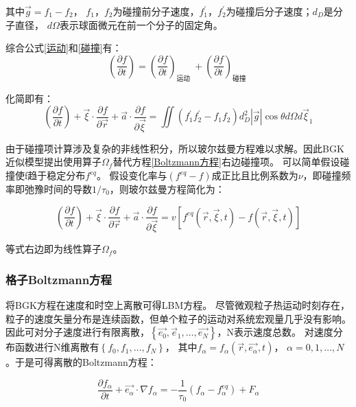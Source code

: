 \noindent  其中$\vec{g} =  f_{1} - f_{2}$， $f_{1}$，$f_{2}$为碰撞前分子速度，$f_{1}^{\prime}$，$f_{2}^{\prime}$为碰撞后分子速度；$d_{D}$是分子直径，
$d \Omega$表示球面微元在前一个分子的固定角。

综合公式\ref{运动}和\ref{碰撞}有：
\begin{equation}\left(\frac{\partial f}{\partial t}\right)=\left(\frac{\partial f}{\partial t}\right)_{\text {运动 }}+\left(\frac{\partial f}{\partial t}\right)_{\text {碰撞 }}\end{equation}

\noindent 化简即有：
\begin{equation}
\label{Boltzmann方程}
\left(\frac{\partial f}{\partial t}\right)+\vec{\xi} \cdot \frac{\partial f}{\partial \vec{r}}+\vec{a} \cdot \frac{\partial f}{\partial \vec{\xi}}=\iint\left(f_{1}^{\prime} f_{2}^{\prime}-f_{1} f_{2}\right) d_{D}^{2}|\vec{g}| \cos \theta d \Omega d \vec{\xi}_{1}\end{equation}

由于碰撞项计算涉及复杂的非线性积分，所以玻尔兹曼方程难以求解。因此BGK近似模型提出使用算子$\Omega_{f}$替代方程\ref{Boltzmann方程}右边碰撞项。
可以简单假设碰撞使f趋于稳定分布$f^{e q}$。
假设变化率与$\left(f^{eq}-f\right)$成正比且比例系数为$\nu$，即碰撞频率即弛豫时间的导数${1}/{\tau_{0}}$，则玻尔兹曼方程简化为：

\begin{equation}\left(\frac{\partial f}{\partial t}\right)+\vec{\xi} \cdot \frac{\partial f}{\partial \vec{r}}+\vec{a} \cdot \frac{\partial f}{\partial \vec{\xi}}=v\left[f^{e q}(\vec{r}, \vec{\xi}, t)-f(\vec{r}, \vec{\xi}, t)\right]\end{equation}

\noindent 等式右边即为线性算子$\Omega_{f}$。

\subsubsection{格子Boltzmann方程}
将BGK方程在速度和时空上离散可得LBM方程。
尽管微观粒子热运动时刻存在，粒子的速度矢量分布是连续函数，但单个粒子的运动对系统宏观量几乎没有影响。
因此可对分子速度进行有限离散，$\left\{\overrightarrow{e_{0}}, \vec{e}_{1}, \ldots, \overrightarrow{e_{N}}\right\}$，N表示速度总数。
对速度分布函数进行N维离散有$\left\{f_{0}, f_{1}, \ldots, f_{N}\right\}$，
其中$f_{\alpha}=f_{\alpha}\left(\vec{r}, \overrightarrow{e_{\alpha}}, t\right)$，
$\alpha=0,1, \ldots, N$。于是可得离散的Boltzmann方程：

\begin{equation}
\label{速度离散}
\frac{\partial f_{\alpha}}{\partial t}+\overrightarrow{e_{\alpha}} \cdot \nabla f_{\alpha}=-\frac{1}{\tau_{0}}\left(f_{\alpha}-f_{\alpha}^{e q}\right)+F_{\alpha}\end{equation}

